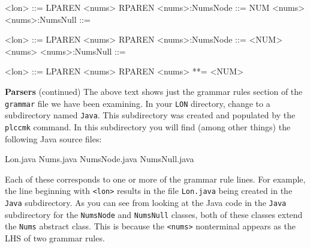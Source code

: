 \begin{minipage}[t]{\sw}
\slidenumber
\LARGE
\begin{SaveVerbatim}{\MYlonGrammarOnly}
<lon>           ::= LPAREN <nums> RPAREN
<nums>:NumsNode ::= NUM <nums>
<nums>:NumsNull ::= 
\end{SaveVerbatim}
\begin{SaveVerbatim}{\MYlonGrammarTOK}
<lon>           ::= LPAREN <nums> RPAREN
<nums>:NumsNode ::= <NUM> <nums>
<nums>:NumsNull ::= 
\end{SaveVerbatim}
\begin{SaveVerbatim}{\MYlonGrammarKleene}
<lon>  ::= LPAREN <nums> RPAREN
<nums> **= <NUM>
\end{SaveVerbatim}
{\bf Parsers} (continued)\exx
\LARGE
\emm\LightBox{\MYlonGrammarOnly}\exx
The above text shows just the grammar rules section
of the \verb'grammar' file we have been examining.\exx
In your \verb'LON' directory,
change to a subdirectory named \verb'Java'.
This subdirectory was created and populated by the \verb'plccmk' command.
In this subdirectory you will find (among other things)
the following Java source files:
\begin{qv}
Lon.java
Nums.java
NumsNode.java
NumsNull.java
\end{qv}
Each of these corresponds to one or more of the grammar rule lines.
For example, the line beginning with \verb'<lon>'
results in the file \verb'Lon.java' being created
in the \verb'Java' subdirectory.
As you can see from looking at the Java code in the \verb'Java' subdirectory
for the \verb'NumsNode' and \verb'NumsNull' classes,
both of these classes extend the \verb'Nums' abstract class.
This is because the \verb'<nums>' nonterminal
appears as the LHS of two grammar rules.
\end{minipage}
\clearpage
